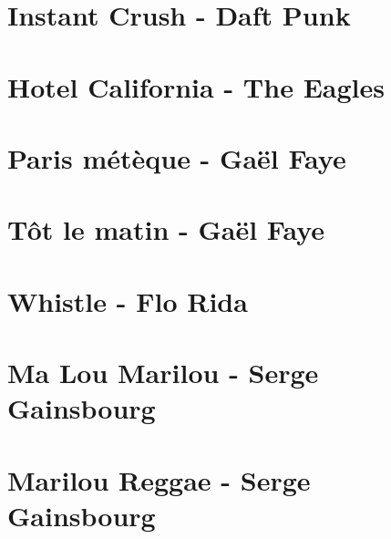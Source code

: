 \documentclass{guitartabs}
\begin{document}
\section{Instant Crush - Daft Punk}
\begin{guitar}

\end{guitar}






\section{Hotel California - The Eagles}
\begin{guitar}

\end{guitar}


\section{Paris métèque - Gaël Faye}
\begin{guitar}

\end{guitar}


\section{Tôt le matin - Gaël Faye}
\begin{guitar}

\end{guitar}

\section{Whistle - Flo Rida}
\begin{guitar}

\end{guitar}


\section{Ma Lou Marilou - Serge Gainsbourg}
\begin{guitar}

\end{guitar}

\section{Marilou Reggae - Serge Gainsbourg}
\begin{guitar}

\end{guitar}
\end{document}
